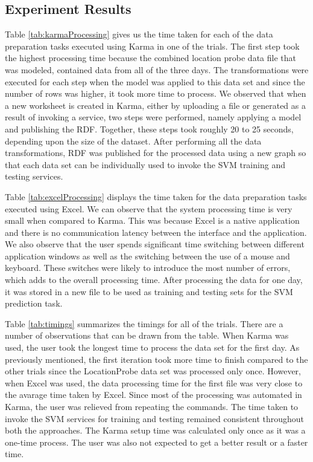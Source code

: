 \subsection{Experiment Results}
Table \ref{tab:karmaProcessing} gives us the time taken for each of the data preparation tasks executed using Karma in one of the trials. The first step took the highest processing time because the combined location probe data file that was modeled, contained data from all of the three days. The transformations were executed for each step when the model was applied to this data set and since the number of rows was higher, it took more time to process. We observed that when a new worksheet is created in Karma, either by uploading a file or generated as a result of invoking a service, two steps were performed, namely applying a model and publishing the RDF. Together, these steps took roughly 20 to 25 seconds, depending upon the size of the dataset. After performing all the data transformations, RDF was published for the processed data using a new graph so that each data set can be individually used to invoke the SVM training and testing services. 


Table \ref{tab:excelProcessing} displays the time taken for the data preparation tasks executed using Excel. We can observe that the system processing time is very small when compared to Karma. This was because Excel is a native application and there is no communication latency between the interface and the application. We also observe that the user spends significant time switching between different application windows as well as the switching between the use of a mouse and keyboard. These switches were likely to introduce the most number of errors, which adds to the overall processing time. After processing the data for one day, it was stored in a new file to be used as training and testing sets for the SVM prediction task.


Table \ref{tab:timings} summarizes the timings for all of the trials. There are a number of observations that can be drawn from the table. When Karma was used, the user took the longest time to process the data set for the first day. As previously mentioned, the first iteration took more time to finish compared to the other trials since the LocationProbe data set was processed only once. However, when Excel was used, the data processing time for the first file was very close to the avarage time taken by Excel. Since most of the processing was automated in Karma, the user was relieved from repeating the commands. The time taken to invoke the SVM services for training and testing remained consistent throughout both the approaches. The Karma setup time was calculated only once as it was a one-time process. The user was also not expected to get a better result or a faster time. 


